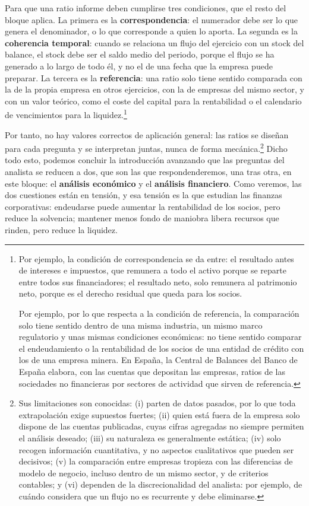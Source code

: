 \documentclass[10pt,a4paper]{article}
\begin{document}
Para que una ratio informe deben cumplirse tres condiciones, que el resto del bloque aplica. La primera es la \textbf{correspondencia}: el numerador debe ser lo que genera el denominador, o lo que corresponde a quien lo aporta. La segunda es la \textbf{coherencia temporal}: cuando se relaciona un flujo del ejercicio con un stock del balance, el stock debe ser el saldo medio del periodo, porque el flujo se ha generado a lo largo de todo él, y no el de una fecha que la empresa puede preparar. La tercera es la \textbf{referencia}: una ratio solo tiene sentido comparada con la de la propia empresa en otros ejercicios, con la de empresas del mismo sector, y con un valor teórico, como el coste del capital para la rentabilidad o el calendario de vencimientos para la liquidez.\footnote{%
    Por ejemplo, la condición de correspondencia se da entre: el resultado antes de intereses e impuestos, que remunera a todo el activo porque se reparte entre todos sus financiadores; el resultado neto, solo remunera al patrimonio neto, porque es el derecho residual que queda para los socios.

    Por ejemplo, por lo que respecta a la condición de referencia, la comparación solo tiene sentido dentro de una misma industria, un mismo marco regulatorio y unas mismas condiciones económicas: no tiene sentido comparar el endeudamiento o la rentabilidad de los socios de una entidad de crédito con los de una empresa minera. En España, la Central de Balances del Banco de España elabora, con las cuentas que depositan las empresas, ratios de las sociedades no financieras por sectores de actividad que sirven de referencia.
}

Por tanto, no hay valores correctos de aplicación general: las ratios se diseñan para cada pregunta y se interpretan juntas, nunca de forma mecánica.\footnote{%
    Sus limitaciones son conocidas: (i) parten de datos pasados, por lo que toda extrapolación exige supuestos fuertes; (ii) quien está fuera de la empresa solo dispone de las cuentas publicadas, cuyas cifras agregadas no siempre permiten el análisis deseado; (iii) su naturaleza es generalmente estática; (iv) solo recogen información cuantitativa, y no aspectos cualitativos que pueden ser decisivos; (v) la comparación entre empresas tropieza con las diferencias de modelo de negocio, incluso dentro de un mismo sector, y de criterios contables; y (vi) dependen de la discrecionalidad del analista: por ejemplo, de cuándo considera que un flujo no es recurrente y debe eliminarse.
} Dicho todo esto, podemos concluir la introducción avanzando que las preguntas del analista se reducen a dos, que son las que respondenderemos, una tras otra, en este bloque: el \textbf{análisis económico} y el \textbf{análisis financiero}. Como veremos, las dos cuestiones están en tensión, y esa tensión es la que estudian las finanzas corporativas: endeudarse puede aumentar la rentabilidad de los socios, pero reduce la solvencia; mantener menos fondo de maniobra libera recursos que rinden, pero reduce la liquidez. 
\end{document}
